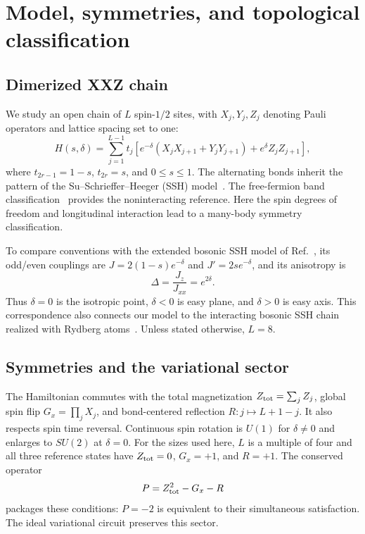 \section{Model, symmetries, and topological classification}
\label{sec:model}

\subsection{Dimerized XXZ chain}

We study an open chain of $L$ spin-$1/2$ sites, with $X_j,Y_j,Z_j$ denoting Pauli operators and lattice spacing set to one:
\begin{equation}
H(s,\delta)=\sum_{j=1}^{L-1}t_j
\left[e^{-\delta}(X_jX_{j+1}+Y_jY_{j+1})
+e^\delta Z_jZ_{j+1}\right],
\label{eq:H}
\end{equation}
where $t_{2r-1}=1-s$, $t_{2r}=s$, and $0\leq s\leq1$.
The alternating bonds inherit the pattern of the Su--Schrieffer--Heeger (SSH) model~\cite{su1979solitons}.
The free-fermion band classification~\cite{ryu2010topological} provides the noninteracting reference.
Here the spin degrees of freedom and longitudinal interaction lead to a many-body symmetry classification.

To compare conventions with the extended bosonic SSH model of Ref.~\cite{elben2020manybody}, its odd/even couplings are $J=2(1-s)e^{-\delta}$ and $J'=2se^{-\delta}$, and its anisotropy is
\begin{equation}
\Delta=\frac{J_z}{J_{xx}}=e^{2\delta}.
\label{eq:anisotropy}
\end{equation}
Thus $\delta=0$ is the isotropic point, $\delta<0$ is easy plane, and $\delta>0$ is easy axis. This correspondence also connects our model to the interacting bosonic SSH chain realized with Rydberg atoms~\cite{deleseleuc2019observation}. Unless stated otherwise, $L=8$.

\subsection{Symmetries and the variational sector}

The Hamiltonian commutes with the total magnetization $Z_{\rm tot}=\sum_jZ_j$, global spin flip $G_x=\prod_jX_j$, and bond-centered reflection $R:j\mapsto L+1-j$.
It also respects spin time reversal. Continuous spin rotation is $U(1)$ for $\delta\neq0$ and enlarges to $SU(2)$ at $\delta=0$.
For the sizes used here, $L$ is a multiple of four and all three reference states have $Z_{\rm tot}=0$, $G_x=+1$, and $R=+1$.
The conserved operator
\begin{equation}
P=Z_{\rm tot}^2-G_x-R
\end{equation}
packages these conditions: $P=-2$ is equivalent to their simultaneous satisfaction. The ideal variational circuit preserves this sector.

